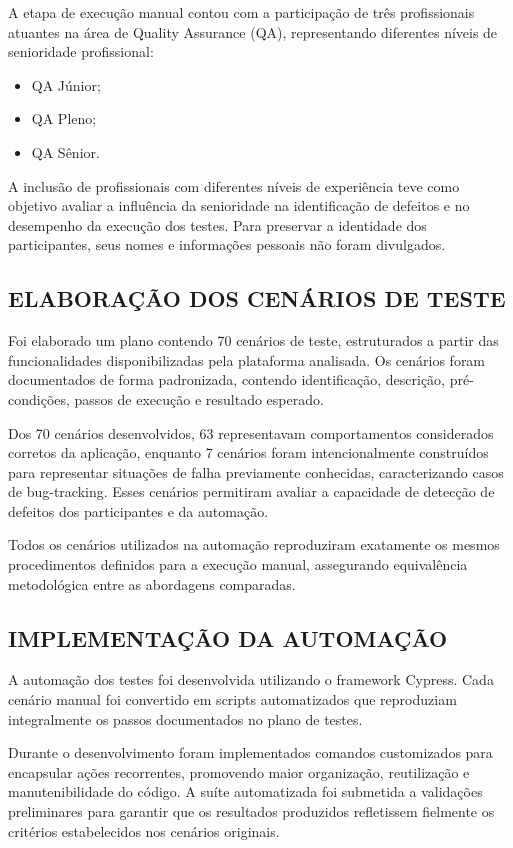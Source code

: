 \documentclass{UNESC}
\begin{document}
A etapa de execução manual contou com a participação de três profissionais atuantes na área de Quality Assurance (QA), representando diferentes níveis de senioridade profissional:

\begin{itemize}
  \item QA Júnior;
  \item QA Pleno;
  \item QA Sênior.
\end{itemize}

A inclusão de profissionais com diferentes níveis de experiência teve como objetivo avaliar a influência da senioridade na identificação de defeitos e no desempenho da execução dos testes. Para preservar a identidade dos participantes, seus nomes e informações pessoais não foram divulgados.

\subsection{ELABORAÇÃO DOS CENÁRIOS DE TESTE}

Foi elaborado um plano contendo 70 cenários de teste, estruturados a partir das funcionalidades disponibilizadas pela plataforma analisada. Os cenários foram documentados de forma padronizada, contendo identificação, descrição, pré-condições, passos de execução e resultado esperado.

Dos 70 cenários desenvolvidos, 63 representavam comportamentos considerados corretos da aplicação, enquanto 7 cenários foram intencionalmente construídos para representar situações de falha previamente conhecidas, caracterizando casos de bug-tracking. Esses cenários permitiram avaliar a capacidade de detecção de defeitos dos participantes e da automação.

Todos os cenários utilizados na automação reproduziram exatamente os mesmos procedimentos definidos para a execução manual, assegurando equivalência metodológica entre as abordagens comparadas.

\subsection{IMPLEMENTAÇÃO DA AUTOMAÇÃO}

A automação dos testes foi desenvolvida utilizando o framework Cypress. Cada cenário manual foi convertido em scripts automatizados que reproduziam integralmente os passos documentados no plano de testes.

Durante o desenvolvimento foram implementados comandos customizados para encapsular ações recorrentes, promovendo maior organização, reutilização e manutenibilidade do código. A suíte automatizada foi submetida a validações preliminares para garantir que os resultados produzidos refletissem fielmente os critérios estabelecidos nos cenários originais.
\end{document}
